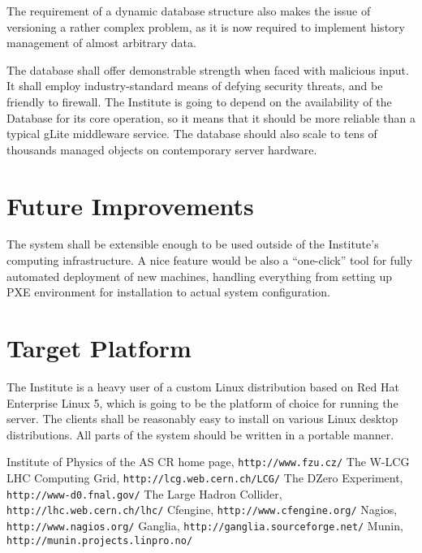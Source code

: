 \documentclass{article}
\begin{document}
The requirement of a dynamic database structure also makes the issue of versioning a rather complex problem, as it is now required
to implement history management of almost arbitrary data. 

The database shall offer demonstrable strength when faced with malicious input.  It shall employ industry-standard means of
defying security threats, and be friendly to firewall.  The Institute is going to depend on the availability of the Database for
its core operation, so it means that it should be more reliable than a typical gLite middleware service.  The database should also
scale to tens of thousands managed objects on contemporary server hardware.

\section{Future Improvements}

The system shall be extensible enough to be used outside of the Institute's computing infrastructure.  A nice feature would be
also a ``one-click'' tool for fully automated deployment of new machines, handling everything from setting up PXE environment for
installation to actual system configuration.

\section{Target Platform}

The Institute is a heavy user of a custom Linux distribution based on Red Hat Enterprise Linux 5, which is going to be the
platform of choice for running the server.  The clients shall be reasonably easy to install on various Linux desktop
distributions.  All parts of the system should be written in a portable manner.

\begin{thebibliography}{9}
    Institute of Physics of the AS CR home page, {\tt http://www.fzu.cz/}
    The W-LCG LHC Computing Grid, {\tt http://lcg.web.cern.ch/LCG/}
    The DZero Experiment, {\tt http://www-d0.fnal.gov/}
    The Large Hadron Collider, {\tt http://lhc.web.cern.ch/lhc/}
    Cfengine, {\tt http://www.cfengine.org/}
    Nagios, {\tt http://www.nagios.org/}
    Ganglia, {\tt http://ganglia.sourceforge.net/}
    Munin, {\tt http://munin.projects.linpro.no/}
\end{thebibliography}
\end{document}
